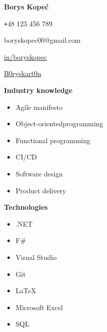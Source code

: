 \documentclass[a4paper,12pt]{article}
\newlength{\leftwidth}
\newenvironment{items}[1]%
{\textbf{#1} \begin{itemize} \setlength{\itemsep}{0mm} \sf}%
{\end{itemize}}
\begin{document}
\centering

\textsf{\textbf{\Huge Borys Kopeć}}
\vspace{7mm}

\begin{minipage}[t][][t]{\leftwidth}
  \begin{description} \setlength{\itemsep}{0mm} \sf
    \item \texttt{+}48 123 456 789
    \item boryskopec00@gmail.com
    \item \faLinkedin \href{https://linkedin.com/in/boryskopec}{in/boryskopec}
    \item \faGithubSquare \href{https://github.com/B0ryskart0n}{B0ryskart0n}
  \end{description}
  \begin{items}{Industry knowledge}
    \item Agile manifesto
    \item Object-oriented\newline programming
    \item Functional programming
    \item CI/CD
    \item Software design
    \item Product delivery
  \end{items}
  \begin{items}{Technologies}
    \item {\Huge.}NET
    \item F\#
    \item Visual Studio
    \item Git
    \item \LaTeX
    \item Microsoft Excel
    \item SQL
  \end{items}
\end{minipage}
\end{document}
